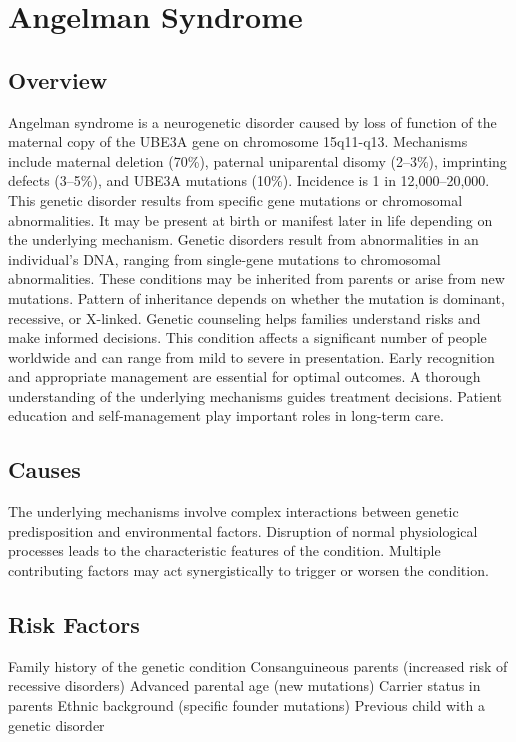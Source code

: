 \chapter{Angelman Syndrome}
\label{sec:Angelman Syndrome}

\section{Overview}
Angelman syndrome is a neurogenetic disorder caused by loss of function of the maternal copy of the UBE3A gene on chromosome 15q11-q13. Mechanisms include maternal deletion (70\%), paternal uniparental disomy (2--3\%), imprinting defects (3--5\%), and UBE3A mutations (10\%). Incidence is 1 in 12,000--20,000. This genetic disorder results from specific gene mutations or chromosomal abnormalities. It may be present at birth or manifest later in life depending on the underlying mechanism. Genetic disorders result from abnormalities in an individual's DNA, ranging from single-gene mutations to chromosomal abnormalities. These conditions may be inherited from parents or arise from new mutations. Pattern of inheritance depends on whether the mutation is dominant, recessive, or X-linked. Genetic counseling helps families understand risks and make informed decisions. This condition affects a significant number of people worldwide and can range from mild to severe in presentation. Early recognition and appropriate management are essential for optimal outcomes. A thorough understanding of the underlying mechanisms guides treatment decisions. Patient education and self-management play important roles in long-term care.
\section{Causes}
The underlying mechanisms involve complex interactions between genetic predisposition and environmental factors. Disruption of normal physiological processes leads to the characteristic features of the condition. Multiple contributing factors may act synergistically to trigger or worsen the condition.
\section{Risk Factors}
Family history of the genetic condition Consanguineous parents (increased risk of recessive disorders) Advanced parental age (new mutations) Carrier status in parents Ethnic background (specific founder mutations) Previous child with a genetic disorder

